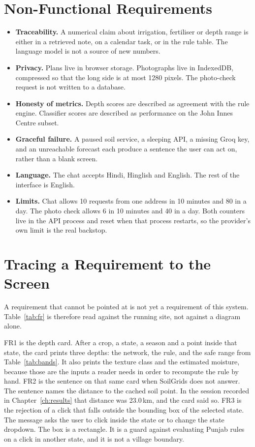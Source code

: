 \section{Non-Functional Requirements}
\begin{itemize}[leftmargin=1.4em]
    \item \textbf{Traceability.} A numerical claim about irrigation, fertiliser or depth range is either in a retrieved note, on a calendar task, or in the rule table. The language model is not a source of new numbers.
    \item \textbf{Privacy.} Plans live in browser storage. Photographs live in IndexedDB, compressed so that the long side is at most 1280 pixels. The photo-check request is not written to a database.
    \item \textbf{Honesty of metrics.} Depth scores are described as agreement with the rule engine. Classifier scores are described as performance on the John Innes Centre subset.
    \item \textbf{Graceful failure.} A paused soil service, a sleeping API, a missing Groq key, and an unreachable forecast each produce a sentence the user can act on, rather than a blank screen.
    \item \textbf{Language.} The chat accepts Hindi, Hinglish and English. The rest of the interface is English.
    \item \textbf{Limits.} Chat allows 10 requests from one address in 10 minutes and 80 in a day. The photo check allows 6 in 10 minutes and 40 in a day. Both counters live in the API process and reset when that process restarts, so the provider's own limit is the real backstop.
\end{itemize}

\section{Tracing a Requirement to the Screen}
A requirement that cannot be pointed at is not yet a requirement of this system. Table~\ref{tab:fr} is therefore read against the running site, not against a diagram alone.

FR1 is the depth card. After a crop, a state, a season and a point inside that state, the card prints three depths: the network, the rule, and the safe range from Table~\ref{tab:bands}. It also prints the texture class and the estimated moisture, because those are the inputs a reader needs in order to recompute the rule by hand. FR2 is the sentence on that same card when SoilGrids does not answer. The sentence names the distance to the cached soil point. In the session recorded in Chapter~\ref{ch:results} that distance was 23.0\,km, and the card said so. FR3 is the rejection of a click that falls outside the bounding box of the selected state. The message asks the user to click inside the state or to change the state dropdown. The box is a rectangle. It is a guard against evaluating Punjab rules on a click in another state, and it is not a village boundary.

